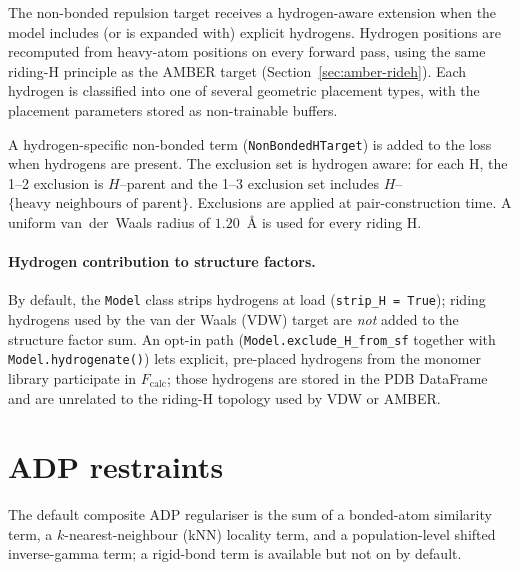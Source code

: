 \documentclass{iucrjournals}
\begin{document}
The non-bonded repulsion target receives a hydrogen-aware extension when
the model includes (or is expanded with) explicit hydrogens.  Hydrogen
positions are recomputed from heavy-atom positions on every forward pass,
using the same riding-H principle as the AMBER target
(Section~\ref{sec:amber-rideh}).  Each hydrogen is classified into one of
several geometric placement types, with the placement parameters stored as
non-trainable buffers.

A hydrogen-specific non-bonded term (\texttt{NonBondedHTarget}) is added
to the loss when hydrogens are present.  The exclusion set is hydrogen
aware: for each H, the 1--2 exclusion is $H$--parent and the 1--3
exclusion set includes $H$--$\{\text{heavy neighbours of parent}\}$.
Exclusions are applied at pair-construction time.  A uniform van~der~Waals
radius of $1.20$~\AA{} is used for every riding H.

\paragraph{Hydrogen contribution to structure factors.}
By default, the \texttt{Model} class strips hydrogens at load
(\texttt{strip\_H = True}); riding hydrogens used by the van der Waals (VDW) target are
\emph{not} added to the structure factor sum.  An opt-in path
(\texttt{Model.exclude\_H\_from\_sf} together with
\texttt{Model.hydrogenate()}) lets explicit, pre-placed hydrogens from
the monomer library participate in $F_\mathrm{calc}$; those hydrogens
are stored in the PDB DataFrame and are unrelated to the riding-H
topology used by VDW or AMBER.


\section{ADP restraints}

The default composite ADP regulariser is the sum of a bonded-atom similarity
term, a $k$-nearest-neighbour (kNN) locality term, and a population-level shifted
inverse-gamma term; a rigid-bond term is available but not on by default.
\end{document}
